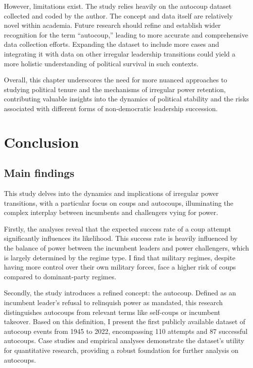 \documentclass[
  12pt,
]{report}
\begin{document}
However, limitations exist. The study relies heavily on the autocoup
dataset collected and coded by the author. The concept and data itself
are relatively novel within academia. Future research should refine and
establish wider recognition for the term ``autocoup,'' leading to more
accurate and comprehensive data collection efforts. Expanding the
dataset to include more cases and integrating it with data on other
irregular leadership transitions could yield a more holistic
understanding of political survival in such contexts.

Overall, this chapter underscores the need for more nuanced approaches
to studying political tenure and the mechanisms of irregular power
retention, contributing valuable insights into the dynamics of political
stability and the risks associated with different forms of
non-democratic leadership succession.

\chapter{Conclusion}\label{conclusion}

\section{Main findings}\label{main-findings}

This study delves into the dynamics and implications of irregular power
transitions, with a particular focus on coups and autocoups,
illuminating the complex interplay between incumbents and challengers
vying for power.

Firstly, the analyses reveal that the expected success rate of a coup
attempt significantly influences its likelihood. This success rate is
heavily influenced by the balance of power between the incumbent leaders
and power challengers, which is largely determined by the regime type. I
find that military regimes, despite having more control over their own
military forces, face a higher risk of coups compared to dominant-party
regimes.

Secondly, the study introduces a refined concept: the autocoup. Defined
as an incumbent leader's refusal to relinquish power as mandated, this
research distinguishes autocoups from relevant terms like self-coups or
incumbent takeover. Based on this definition, I present the first
publicly available dataset of autocoup events from 1945 to 2022,
encompassing 110 attempts and 87 successful autocoups. Case studies and
empirical analyses demonstrate the dataset's utility for quantitative
research, providing a robust foundation for further analysis on
autocoups.
\end{document}
